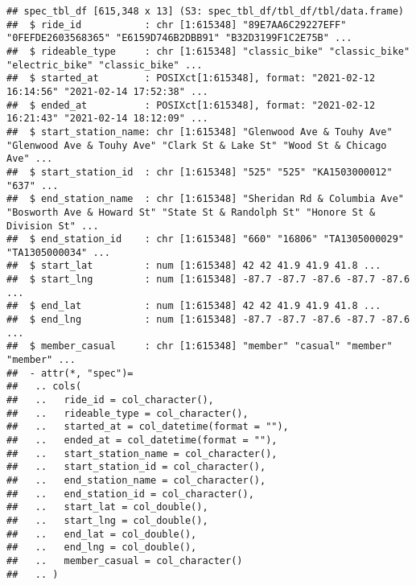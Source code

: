 \documentclass[
]{article}
\begin{document}
\begin{verbatim}
## spec_tbl_df [615,348 x 13] (S3: spec_tbl_df/tbl_df/tbl/data.frame)
##  $ ride_id           : chr [1:615348] "89E7AA6C29227EFF" "0FEFDE2603568365" "E6159D746B2DBB91" "B32D3199F1C2E75B" ...
##  $ rideable_type     : chr [1:615348] "classic_bike" "classic_bike" "electric_bike" "classic_bike" ...
##  $ started_at        : POSIXct[1:615348], format: "2021-02-12 16:14:56" "2021-02-14 17:52:38" ...
##  $ ended_at          : POSIXct[1:615348], format: "2021-02-12 16:21:43" "2021-02-14 18:12:09" ...
##  $ start_station_name: chr [1:615348] "Glenwood Ave & Touhy Ave" "Glenwood Ave & Touhy Ave" "Clark St & Lake St" "Wood St & Chicago Ave" ...
##  $ start_station_id  : chr [1:615348] "525" "525" "KA1503000012" "637" ...
##  $ end_station_name  : chr [1:615348] "Sheridan Rd & Columbia Ave" "Bosworth Ave & Howard St" "State St & Randolph St" "Honore St & Division St" ...
##  $ end_station_id    : chr [1:615348] "660" "16806" "TA1305000029" "TA1305000034" ...
##  $ start_lat         : num [1:615348] 42 42 41.9 41.9 41.8 ...
##  $ start_lng         : num [1:615348] -87.7 -87.7 -87.6 -87.7 -87.6 ...
##  $ end_lat           : num [1:615348] 42 42 41.9 41.9 41.8 ...
##  $ end_lng           : num [1:615348] -87.7 -87.7 -87.6 -87.7 -87.6 ...
##  $ member_casual     : chr [1:615348] "member" "casual" "member" "member" ...
##  - attr(*, "spec")=
##   .. cols(
##   ..   ride_id = col_character(),
##   ..   rideable_type = col_character(),
##   ..   started_at = col_datetime(format = ""),
##   ..   ended_at = col_datetime(format = ""),
##   ..   start_station_name = col_character(),
##   ..   start_station_id = col_character(),
##   ..   end_station_name = col_character(),
##   ..   end_station_id = col_character(),
##   ..   start_lat = col_double(),
##   ..   start_lng = col_double(),
##   ..   end_lat = col_double(),
##   ..   end_lng = col_double(),
##   ..   member_casual = col_character()
##   .. )
\end{verbatim}
\end{document}
